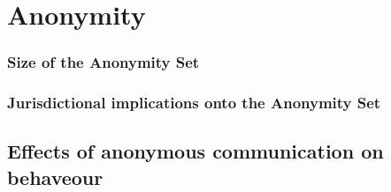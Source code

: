 \chapter{Anonymity}

\subsection{Size of the Anonymity Set}

\subsection{Jurisdictional implications onto the Anonymity Set}

\section{Effects of anonymous communication on behaveour}


